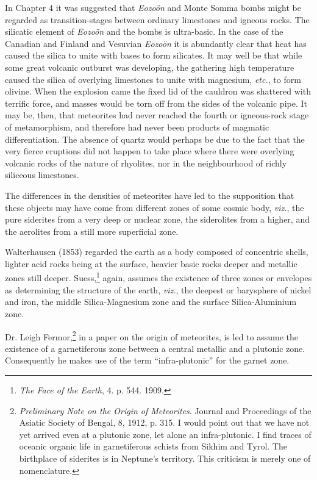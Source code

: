 \documentclass[a4paper, 12pt, oneside]{article}
\begin{document}
In Chapter 4 it was suggested that \emph{Eozoön} and Monte Somma bombs might be regarded as transition-stages between ordinary limestones and igneous rocks. The silicatic element of \emph{Eozoön} and the bombs is ultra-basic. In the case of the Canadian and Finland and Vesuvian \emph{Eozoön} it is abundantly clear that heat has caused the silica to unite with bases to form silicates. It may well be that while some great volcanic outburst was developing, the gathering high temperature caused the silica of overlying limestones to unite with magnesium, \emph{etc.}, to form olivine. When the explosion came the fixed lid of the cauldron was shattered with terrific force, and masses would be torn off from the sides of the volcanic pipe. It may be, then, that meteorites had never reached the fourth or igneous-rock stage of metamorphism, and therefore had never been products of magmatic differentiation. The absence of quartz would perhaps be due to the fact that the very fierce eruptions did not happen to take place where there were overlying volcanic rocks of the nature of rhyolites, nor in the neighbourhood of richly siliceous limestones.

The differences in the densities of meteorites have led to the supposition that these objects may have come from different zones of some cosmic body, \emph{viz.}, the pure siderites from a very deep or nuclear zone, the siderolites from a higher, and the aerolites from a still more superficial zone.

Walterhausen (1853) regarded the earth as a body composed of concentric shells, lighter acid rocks being at the surface, heavier basic rocks deeper and metallic zones still deeper. Suess,\footnote{\emph{The Face of the Earth}, 4. p. 544. 1909.} again, assumes the existence of three zones or envelopes as determining the structure of the earth, \emph{viz.}, the deepest or barysphere of nickel and iron, the middle Silica-Magnesium zone and the surface Silica-Aluminium zone.

Dr. Leigh Fermor,\footnote{\emph{Preliminary Note on the Origin of Meteorites}. Journal and Proceedings of the Asiatic Society of Bengal, 8, 1912, p. 315. I would point out that we have not yet arrived even at a plutonic zone, let alone an infra-plutonic. I find traces of oceanic organic life in garnetiferous schists from Sikhim and Tyrol. The birthplace of siderites is in Neptune's territory. This criticism is merely one of nomenclature.} in a paper on the origin of meteorites, is led to assume the existence of a garnetiferous zone between a central metallic and a plutonic zone. Consequently he makes use of the term ``infra-plutonic'' for the garnet zone.
\end{document}
